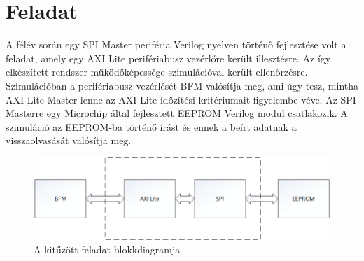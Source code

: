 \documentclass[a4paper,11pt]{article}
\begin{document}
\section{Feladat}
A félév során egy SPI Master periféria Verilog nyelven történő fejlesztése volt a feladat, amely egy AXI Lite perifériabusz vezérlőre került illesztésre. Az így elkészített rendszer működőképessége szimulációval került ellenőrzésre. Szimulációban a perifériabusz vezérlését BFM valósítja meg, ami úgy tesz, mintha AXI Lite Master lenne az AXI Lite időzítési kritériumait figyelembe véve. Az SPI Masterre egy Microchip által fejlesztett EEPROM Verilog modul csatlakozik. A szimuláció az EEPROM-ba történő írást és ennek a beírt adatnak a visszaolvasását valósítja meg.
\begin{figure}[H]
	\begin{center}
	\includegraphics[scale=0.7]{genbd.png}
	\caption{A kitűzött feladat blokkdiagramja}
	\label{fig:genbd}
	\end{center}
\end{figure}
\end{document}
